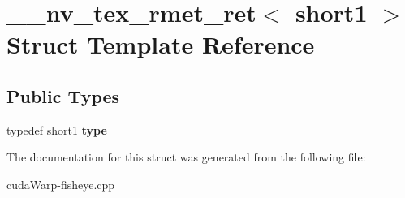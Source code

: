 \hypertarget{struct____nv__tex__rmet__ret_3_01short1_01_4}{}\section{\+\_\+\+\_\+nv\+\_\+tex\+\_\+rmet\+\_\+ret$<$ short1 $>$ Struct Template Reference}
\label{struct____nv__tex__rmet__ret_3_01short1_01_4}
\subsection*{Public Types}
\begin{DoxyCompactItemize}
\item 
typedef \hyperlink{structshort1}{short1} {\bfseries type}\hypertarget{struct____nv__tex__rmet__ret_3_01short1_01_4_ac59bc1443f5cd279ab41e4bbece3465b}{}\label{struct____nv__tex__rmet__ret_3_01short1_01_4_ac59bc1443f5cd279ab41e4bbece3465b}

\end{DoxyCompactItemize}


The documentation for this struct was generated from the following file\+:\begin{DoxyCompactItemize}
\item 
cuda\+Warp-\/fisheye.\+cpp\end{DoxyCompactItemize}
